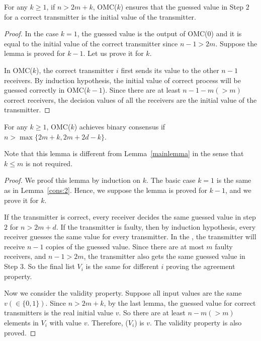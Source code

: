 \begin{lemma}
For any $k\geqslant 1$, if $n>2m+k$, OMC($k$) ensures that the guessed value in Step $2$ for a correct transmitter is the initial value of the transmitter.
\end{lemma}

\begin{proof}
In the case $k=1$, the guessed value is the output of OMC(0) and  it is equal to the initial value of the correct transmitter since $n-1>2m$. Suppose the lemma is proved for $k-1$. Let us prove it for $k$.

In OMC($k$), the correct transmitter $i$ first sends its value to the other $n-1$ receivers. 
By induction hypothesis, the initial value of correct process will be guessed  correctly in OMC($k-1$). 
Since there are at least $n-1-m(>m)$ correct receivers, the decision values of all the receivers are the initial value of the transmitter.
\end{proof}

\begin{lemma}\label{cons:corelemma}
  For any $k \geqslant 1$, OMC($k$) achieves binary consensus if $n>\max\{2m+k,2m+2d-k\}$.
\end{lemma}

Note that this lemma is different from Lemma~\ref{mainlemma} in the sense that $k\leqslant m$ is not required.

\begin{proof}
We proof this lemma by induction on $k$. The basic case $k=1$ is the same as in Lemma~\ref{cons:2}.
Hence, we suppose the lemma is proved for $k-1$, and we prove it for $k$.

If the transmitter is correct, every receiver decides the same guessed value in step $2$ for $n>2m+d$. 
If the transmitter is faulty, then
by induction hypothesis, every receiver  guesses the same value for every transmitter. 
In the , the transmitter will receive $n-1$ copies of the guessed value. 
Since there are at most $m$ faulty receivers, and $n-1>2m$, the transmitter 
also gets the same guessed value in Step $3$. 
So the final list $V_i$ is the same for different $i$ proving the agreement property. 

Now we consider  the validity property.
Suppose all input values are the same $v(\in \{0,1\})$. 
Since $n>2m+k$, by the last lemma, the guessed value for correct transmitters is the real initial value $v$. So there are at least $n-m (> m)$ elements in $V_i$ with value $v$. Therefore, ($V_i$) is $v$. 
The validity property is also proved.
\end{proof}


